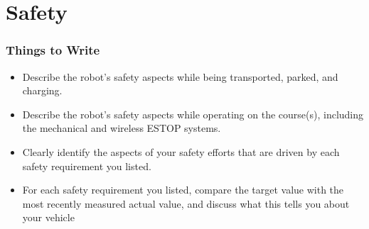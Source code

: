 \section{Safety}
\subsubsection*{Things to Write}

\begin{itemize}
  \item Describe the robot's safety aspects while being transported, parked, and charging.
  \item Describe the robot's safety aspects while operating on the course(s), including the mechanical and wireless ESTOP systems.
  \item Clearly identify the aspects of your safety efforts that are driven by each safety requirement you listed.
  \item For each safety requirement you listed, compare the target value with the most recently measured actual value, and discuss what this tells you about your vehicle
\end{itemize}
